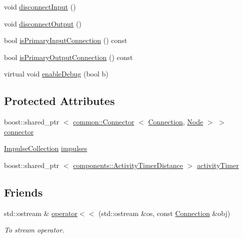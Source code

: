 \begin{DoxyCompactItemize}
void \hyperlink{classcryomesh_1_1components_1_1Connection_aea5f7cbc5e732729b30611b31964a9f7}{disconnect\-Input} ()
\item 
void \hyperlink{classcryomesh_1_1components_1_1Connection_abbb25c5222aa18da00097e96b1c50a5f}{disconnect\-Output} ()
\item 
bool \hyperlink{classcryomesh_1_1components_1_1Connection_a7455c6e4c45ffff9e7a64146bc5ff6e2}{is\-Primary\-Input\-Connection} () const 
\item 
bool \hyperlink{classcryomesh_1_1components_1_1Connection_a967fb5cafcd38f0ceec16437ea160d23}{is\-Primary\-Output\-Connection} () const 
\item 
virtual void \hyperlink{classcryomesh_1_1components_1_1Connection_a276be807f8cf331e1965661a67100440}{enable\-Debug} (bool b)
\end{DoxyCompactItemize}
\subsection*{\-Protected \-Attributes}
\begin{DoxyCompactItemize}
\item 
boost\-::shared\-\_\-ptr\*
$<$ \hyperlink{classcryomesh_1_1common_1_1Connector}{common\-::\-Connector}\*
$<$ \hyperlink{classcryomesh_1_1components_1_1Connection}{\-Connection}, \hyperlink{classcryomesh_1_1components_1_1Node}{\-Node} $>$ $>$ \hyperlink{classcryomesh_1_1components_1_1Connection_ab6d2d5386a6fe3dc5e5797a0b131ea15}{connector}
\item 
\hyperlink{classcryomesh_1_1components_1_1ImpulseCollection}{\-Impulse\-Collection} \hyperlink{classcryomesh_1_1components_1_1Connection_a00323e7080eba7a1bfae022915022f47}{impulses}
\item 
boost\-::shared\-\_\-ptr\*
$<$ \hyperlink{classcryomesh_1_1components_1_1ActivityTimerDistance}{components\-::\-Activity\-Timer\-Distance} $>$ \hyperlink{classcryomesh_1_1components_1_1Connection_aec487280dd02b018049b7a1dd6906861}{activity\-Timer}
\end{DoxyCompactItemize}
\subsection*{\-Friends}
\begin{DoxyCompactItemize}
\item 
std\-::ostream \& \hyperlink{classcryomesh_1_1components_1_1Connection_ac7d751fcf5dc9a4daa22cc6ad770f06b}{operator$<$$<$} (std\-::ostream \&os, const \hyperlink{classcryomesh_1_1components_1_1Connection}{\-Connection} \&obj)
\begin{DoxyCompactList}\small\item\em \-To stream operator. \end{DoxyCompactList}\end{DoxyCompactItemize}


